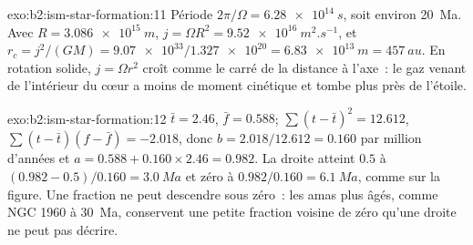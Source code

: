 \begin{solution}{exo:b2:ism-star-formation:11}
Période $2\pi/\Omega = \qty{6.28e14}{s}$, soit environ \qty{20}{Ma}. Avec
$R = \qty{3.086e15}{m}$, $j = \Omega R^2 = \qty{9.52e16}{m^2.s^{-1}}$, et
$r_c = j^2/(GM) = \num{9.07e33}/\num{1.327e20} = \qty{6.83e13}{m} = \qty{457}{au}$.
En rotation solide, $j = \Omega r^2$ croît comme le carré de la distance à l'axe~:
le gaz venant de l'intérieur du cœur a moins de moment cinétique et tombe plus près de l'étoile.
\end{solution}

\begin{solution}{exo:b2:ism-star-formation:12}
$\bar t = 2.46$, $\bar f = 0.588$; $\sum(t - \bar t)^2 = 12.612$,
$\sum(t - \bar t)(f - \bar f) = -2.018$, donc $b = 2.018/12.612 = 0.160$ par million
d'années et $a = 0.588 + 0.160\times2.46 = 0.982$. La droite atteint $0.5$ à
$(0.982 - 0.5)/0.160 = \qty{3.0}{Ma}$ et zéro à $0.982/0.160 = \qty{6.1}{Ma}$, comme sur
la figure. Une fraction ne peut descendre sous zéro~: les amas plus âgés, comme NGC 1960 à
\qty{30}{Ma}, conservent une petite fraction voisine de zéro qu'une droite ne peut pas décrire.
\end{solution}

